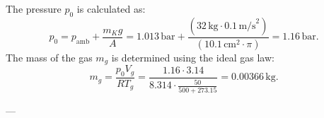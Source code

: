 The pressure \( p_0 \) is calculated as:  
\[
p_0 = p_{\text{amb}} + \frac{m_K g}{A} = 1.013 \, \text{bar} + \frac{(32 \, \text{kg} \cdot 0.1 \, \text{m/s}^2)}{(10.1 \, \text{cm}^2 \cdot \pi)} = 1.16 \, \text{bar}.
\]  
The mass of the gas \( m_g \) is determined using the ideal gas law:  
\[
m_g = \frac{p_0 V_g}{R T_g} = \frac{1.16 \cdot 3.14}{8.314 \cdot \frac{50}{500 + 273.15}} = 0.00366 \, \text{kg}.
\]  

---